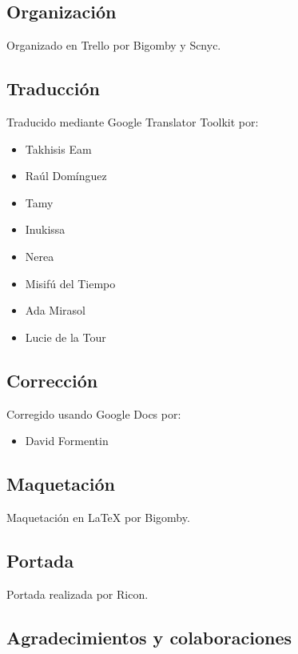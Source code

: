 \subsection*{Organización}\label{organizaciuxf3n}

Organizado en Trello por Bigomby y Scnyc.

\subsection*{Traducción}\label{traducciuxf3n}

Traducido mediante Google Translator Toolkit por:

\begin{itemize}
\itemsep1pt\parskip0pt
\item
  Takhisis Eam
\item
  Raúl Domínguez
\item
  Tamy
\item
  Inukissa
\item
  Nerea
\item
  Misifú del Tiempo
\item
  Ada Mirasol
\item
  Lucie de la Tour
\end{itemize}

\subsection*{Corrección}\label{correcciuxf3n}

Corregido usando Google Docs por:

\begin{itemize}
\itemsep1pt\parskip0pt
\item
  David Formentin
\end{itemize}

\subsection*{Maquetación}\label{maquetaciuxf3n}

Maquetación en LaTeX por Bigomby.

\subsection*{Portada}\label{portada}

Portada realizada por Ricon.

\subsection*{Agradecimientos y
colaboraciones}\label{agradecimientos-y-colaboraciones}


